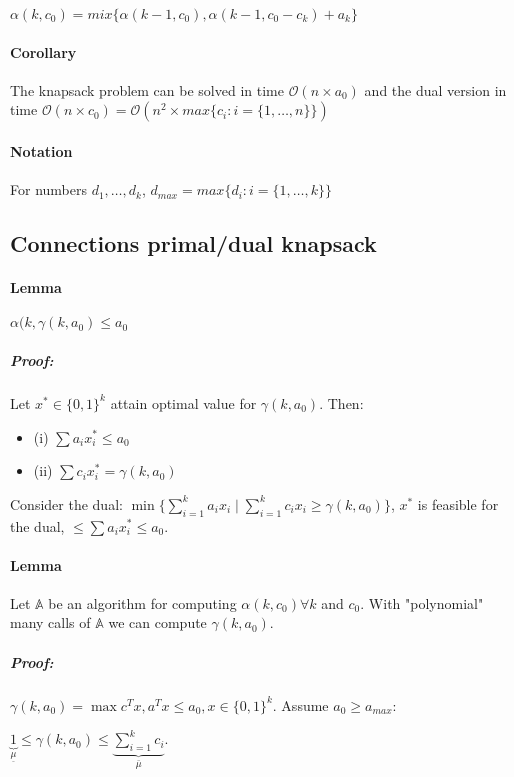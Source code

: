 \documentclass[main]{subfiles}
\begin{document}
$\alpha(k, c_{0}) = mix\{\alpha(k-1, c_{0}), \alpha(k-1, c_{0} - c_{k}) + a_{k}\}$

\paragraph{Corollary} The knapsack problem can be solved in time $\mathcal{O}(n \times a_{0})$ and the dual version in time $\mathcal{O}(n \times c_{0}) = \mathcal{O}(n^{2} \times max\{c_{i}: i = \{1, \dots, n\}\})$

\paragraph{Notation} For numbers $d_{1}, \dots, d_{k}$, $d_{max} = max\{d_{i}: i =\{1, \dots, k\} \}$

\subsection{Connections primal/dual knapsack}

\paragraph{Lemma} $\alpha(k, \gamma(k, a_{0}) \leq a_{0}$

\subparagraph{Proof:}
Let $x^{*} \in \{0,1\}^{k}$ attain optimal value for $\gamma(k, a_{0})$.
Then:
\begin{itemize}
\item (i) $\sum a_{i}x_{i}^{*} \leq a_{0}$
\item (ii) $\sum c_{i}x_{i}^{*} = \gamma(k, a_{0})$
\end{itemize}

Consider the dual: $\min \{\sum_{i=1}^{k} a_i x_{i} \mid \sum_{i=1}^{k} c_{i}x_{i} \geq \gamma(k, a_{0})\}$, $x^{*}$ is feasible for the dual, $\leq \sum a_{i}x_{i}^{*} \leq a_{0}$.

\paragraph{Lemma} Let $\mathbb{A}$ be an algorithm for computing $\alpha(k, c_{0}) \forall k$ and $c_{0}$. With "polynomial" many calls of $\mathbb{A}$ we can compute $\gamma(k, a_{0})$.

\subparagraph{Proof:}
$\gamma(k, a_{0}) = \max c^{T}x, a^{T}x \leq a_{0}, x \in \{0,1\}^{k}$. Assume $a_{0} \geq a_{max}$:

$\underbrace{1}_{\underline{\mu}} \leq \gamma(k, a_{0}) \leq \underbrace{\sum_{i=1}^{k}c_{i}}_{\bar{\mu}}$.
\end{document}
